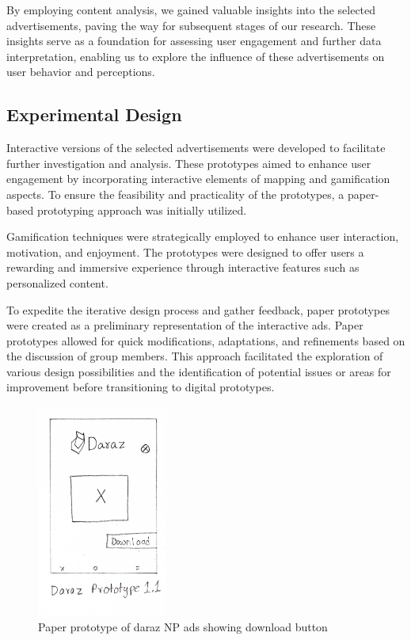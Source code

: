 \documentclass[journal]{IEEEtran}
\begin{document}
By employing content analysis, we gained valuable insights into the selected advertisements,
paving the way for subsequent stages of our research. These insights serve as a foundation
for assessing user engagement and further data interpretation, enabling us to explore the
influence of these advertisements on user behavior and perceptions.

\subsection{Experimental Design}
Interactive versions of the selected advertisements were developed to facilitate further
investigation and analysis. These prototypes aimed to enhance user engagement by incorporating
interactive elements of mapping and gamification aspects. To ensure the feasibility and practicality of
the prototypes, a paper-based prototyping approach was initially utilized.

Gamification techniques were strategically employed to enhance user interaction, motivation,
and enjoyment. The prototypes were designed to offer users a rewarding and immersive experience
through interactive features such as personalized content.

To expedite the iterative design process and gather feedback, paper prototypes were created as a
preliminary representation of the interactive ads. Paper prototypes allowed for quick modifications,
adaptations, and refinements based on the discussion of group members. This approach facilitated the
exploration of various design possibilities and the identification of potential issues or areas for
improvement before transitioning to digital prototypes.

\begin{figure}[H]
    \centering
    \includegraphics[height=7cm]{dp1.jpg}
    \caption{Paper prototype of daraz NP ads showing download button}
\end{figure}
\end{document}
